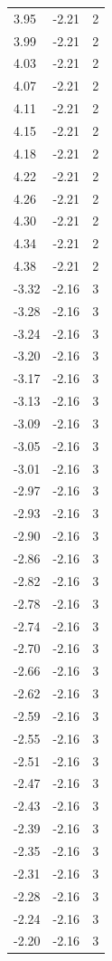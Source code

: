 \begin{longtable}{lrr}
  3.95 & -2.21 & 2 \\
  3.99 & -2.21 & 2 \\
  4.03 & -2.21 & 2 \\
  4.07 & -2.21 & 2 \\
  4.11 & -2.21 & 2 \\
  4.15 & -2.21 & 2 \\
  4.18 & -2.21 & 2 \\
  4.22 & -2.21 & 2 \\
  4.26 & -2.21 & 2 \\
  4.30 & -2.21 & 2 \\
  4.34 & -2.21 & 2 \\
  4.38 & -2.21 & 2 \\
  -3.32 & -2.16 & 3 \\
  -3.28 & -2.16 & 3 \\
  -3.24 & -2.16 & 3 \\
  -3.20 & -2.16 & 3 \\
  -3.17 & -2.16 & 3 \\
  -3.13 & -2.16 & 3 \\
  -3.09 & -2.16 & 3 \\
  -3.05 & -2.16 & 3 \\
  -3.01 & -2.16 & 3 \\
  -2.97 & -2.16 & 3 \\
  -2.93 & -2.16 & 3 \\
  -2.90 & -2.16 & 3 \\
  -2.86 & -2.16 & 3 \\
  -2.82 & -2.16 & 3 \\
  -2.78 & -2.16 & 3 \\
  -2.74 & -2.16 & 3 \\
  -2.70 & -2.16 & 3 \\
  -2.66 & -2.16 & 3 \\
  -2.62 & -2.16 & 3 \\
  -2.59 & -2.16 & 3 \\
  -2.55 & -2.16 & 3 \\
  -2.51 & -2.16 & 3 \\
  -2.47 & -2.16 & 3 \\
  -2.43 & -2.16 & 3 \\
  -2.39 & -2.16 & 3 \\
  -2.35 & -2.16 & 3 \\
  -2.31 & -2.16 & 3 \\
  -2.28 & -2.16 & 3 \\
  -2.24 & -2.16 & 3 \\
  -2.20 & -2.16 & 3 \\

\end{longtable}
